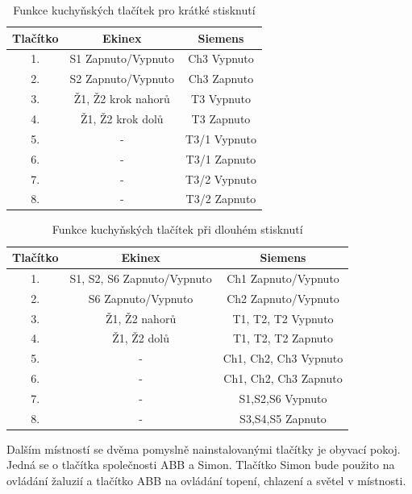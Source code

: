 \begin{table}[h]
 \caption[Funkce kuchyňských tlačítek pro krátké stisknutí]{Funkce kuchyňských tlačítek pro krátké stisknutí}
   \small
    \centering
	  \begin{tabular}{|c|c|c|}
	    \hline
	    Tlačítko & Ekinex & Siemens  \\
	    \hline\hline
	    1. & S1 Zapnuto/Vypnuto & Ch3 Vypnuto \\
	    \hline
        2. & S2 Zapnuto/Vypnuto & Ch3 Zapnuto \\
	    \hline
        3. & Ž1, Ž2 krok nahorů & T3 Vypnuto \\
	    \hline
        4. & Ž1, Ž2 krok dolů & T3 Zapnuto \\
	    \hline
        5. & - & T3/1 Vypnuto \\
	    \hline 
        6. & - & T3/1 Zapnuto \\
	    \hline 
	    7. & - & T3/2 Vypnuto \\
	    \hline
	    8. & - & T3/2 Zapnuto \\
	    \hline
	  \end{tabular}
\end{table}

\begin{table}[h]
 \caption[Funkce kuchyňských tlačítek při dlouhém stisknutí]{Funkce kuchyňských tlačítek při dlouhém stisknutí}
   \small
    \centering
	  \begin{tabular}{|c|c|c|}
	    \hline
	    Tlačítko & Ekinex & Siemens  \\
	    \hline\hline
	    1. & S1, S2, S6 Zapnuto/Vypnuto &  Ch1 Zapnuto/Vypnuto \\
	    \hline
        2. & S6 Zapnuto/Vypnuto &  Ch2 Zapnuto/Vypnuto \\
	    \hline
        3. &  Ž1, Ž2 nahorů & T1, T2, T2 Vypnuto \\
	    \hline
        4. & Ž1, Ž2 dolů & T1, T2, T2 Zapnuto \\
	    \hline
        5. & - &  Ch1, Ch2, Ch3 Vypnuto\\
	    \hline 
        6. & - & Ch1, Ch2, Ch3 Zapnuto \\
	    \hline 
	    7. & - & S1,S2,S6 Vypnuto \\
	    \hline
	    8. & - & S3,S4,S5 Zapnuto \\
	    \hline
	  \end{tabular}
\end{table}

\newpage Dalším místností se dvěma pomyslně nainstalovanými tlačítky je obyvací pokoj. Jedná se o tlačítka společnosti ABB a Simon. Tlačítko Simon bude použito na ovládání žaluzií a tlačítko ABB na ovládání topení, chlazení a světel v místnosti.

